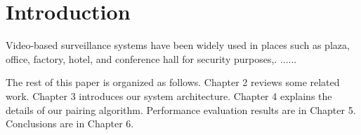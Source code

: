 \chapter{Introduction}
\label{ch:intro}
Video-based surveillance systems have been widely used in places such as plaza, office, factory, hotel, and conference hall for security purposes\cite{collins2000system},\cite{wang2013intelligent}. ......

The rest of this paper is organized as follows. Chapter 2 reviews some related work. Chapter 3 introduces our system architecture. Chapter 4 explains the details of our pairing algorithm. Performance evaluation results are in Chapter 5. Conclusions are in Chapter 6.
